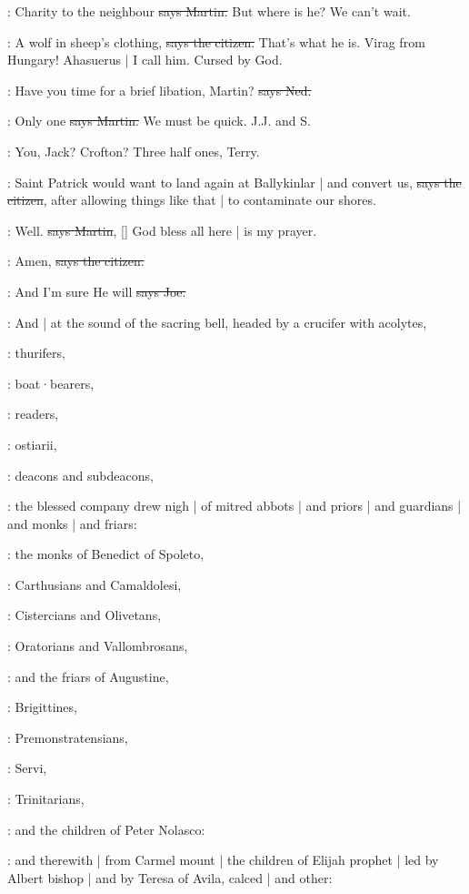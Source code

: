 \cunningham:
Charity to the neighbour
\sout{says Martin.}
But where is he?
We can't wait.

\citizen:
A wolf in sheep's clothing,
\sout{says the citizen.}
That's what he is.
Virag from Hungary!
Ahasuerus |
I call him.
Cursed by God.

\lambert:
Have you time for a brief libation,
Martin?
\sout{says Ned.}

\cunningham:
Only one
\sout{says Martin.}
We must be quick.
J.J. and S.

\lambert:
You,
Jack?
Crofton?
Three half ones,
Terry.

\citizen:
Saint Patrick would want to land again at Ballykinlar |
and convert us,
\sout{says the citizen},
after allowing things like that |
to contaminate our shores.

\cunningham:
Well.
\sout{says Martin},
[]
God bless all here |
is my prayer.

\citizen:
Amen,
\sout{says the citizen.}

\joe:
And I'm sure He will
\sout{says Joe.}

:
And |
at the sound of the sacring bell,
headed by a crucifer with acolytes,

:
thurifers,

:
boat·bearers,

:
readers,

:
ostiarii,

:
deacons and subdeacons,

:
the blessed company drew nigh |
of mitred abbots |
and priors |
and guardians |
and monks |
and friars:

:
the monks of Benedict of Spoleto,

:
Carthusians and Camaldolesi,

:
Cistercians and Olivetans,

:
Oratorians and Vallombrosans,

:
and the friars of Augustine,

:
Brigittines,

:
Premonstratensians,

:
Servi,

:
Trinitarians,

:
and the children of Peter Nolasco:

:
and therewith |
from Carmel mount |
the children of Elijah prophet |
led by Albert bishop |
and by Teresa of Avila,
calced |
and other:

